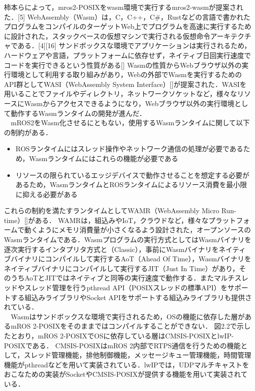 柿本らによって，mros2-POSIXをwasm環境で実行するmros2-wasmが提案された．[5]
WebAssembly（Wasm）は，C，C++，C\#，Rustなどの言語で書かれたプログラムをコンパイルのターゲットWeb上でプログラムを高速に実行するために設計された，スタックベースの仮想マシンで実行される仮想命令アーキテクチャである．[4][16]
サンドボックスな環境でアプリケーションは実行されるため，ハードウェアや言語，プラットフォームに依存せず，ネイティブ日回実行速度でコードを実行できるという性質がある[]
Wasmの性質からWebブラウザ以外の実行環境として利用する取り組みがあり，Webの外部でWasmを実行するためのAPI群としてWASI（WebAssembly System Interface）[]が提案された．WASIを用いることでファイルやディレクトリ，ネットワークソケットなど，様々なリソースにWasmからアクセスできるようになり，Webブラウザ以外の実行環境として動作するWasmランタイムの開発が進んだ．
\\　mROS2をWasm化させるにともない，使用するWasmランタイムに関して以下の制約がある．
\begin{itemize}
    \item ROSランタイムにはスレッド操作やネットワーク通信の処理が必要であるため，Wasmランタイムにはこれらの機能が必要である
    \item リソースの限られているエッジデバイスで動作させることを想定する必要があるため，WasmランタイムとROSランタイムによるリソース消費を最小限に抑える必要がある
\end{itemize}
これらの制約を満たすランタイムとしてWAMR（WebAssembly Micro Run-time）[]がある．
WAMRは，組込みやIoT，クラウドなど，様々なプラットフォームで動くようにメモリ消費量が小さくなるよう設計された，オープンソースのWasmランタイムである．Wasmプログラムの実行方式としてはWasmバイナリを逐次実行するインタプリタ方式と（Classic），事前にWasmバイナリをネイティブバイナリにコンパイルして実行するAoT（Ahead Of Time），Wasmバイナリをネイティブバイナリにコンパイルして実行するJIT（Just In Time）があり，そのうちAoTとJITではネイティブと同等の実行速度で動作する．またマルチスレッドやスレッド管理を行うpthread API（POSIXスレッドの標準API）をサポートする組込みライブラリやSocket APIをサポートする組込みライブラリも提供されている．\\　Wasmはサンドボックスな環境で実行されるため，OSの機能に依存した層があるmROS 2-POSIXをそのままではコンパイルすることができない．
図2.2で示したとおり，mROS 2-POSIXでOSに依存している層はCMSIS-POSIXとlwIP-POSIXである．
CMSIS-POSIXはmROS 2内部でRTPS通信を行うための機能として，スレッド管理機能，排他制御機能，メッセージキュー管理機能，時間管理機能がpthreadなどを用いて実装されている．lwIPでは，UDPマルチキャストをおこなための実装がSocketやCMSIS-POSIXが提供する機能を用いて実装されている．
